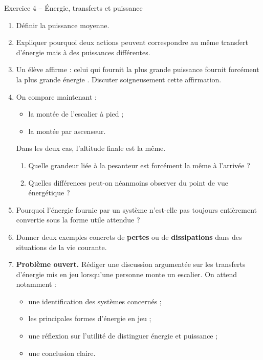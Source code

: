 \documentclass[11pt,a4paper]{article}
\begin{document}
\begin{exobox}{Exercice 4 -- Énergie, transferts et puissance}
\begin{enumerate}[label=\textbf{\arabic*.}]
    \item Définir la puissance moyenne.

    \item Expliquer pourquoi deux actions peuvent correspondre au même transfert d’énergie mais à des puissances différentes.

    \item Un élève affirme : \og celui qui fournit la plus grande puissance fournit forcément la plus grande énergie \fg.  
    Discuter soigneusement cette affirmation.

    \item On compare maintenant :
    \begin{itemize}
        \item la montée de l’escalier à pied ;
        \item la montée par ascenseur.
    \end{itemize}
    Dans les deux cas, l’altitude finale est la même.
    \begin{enumerate}[label=\alph*)]
        \item Quelle grandeur liée à la pesanteur est forcément la même à l’arrivée ?
        \item Quelles différences peut-on néanmoins observer du point de vue énergétique ?
    \end{enumerate}

    \item Pourquoi l’énergie fournie par un système n’est-elle pas toujours entièrement convertie sous la forme utile attendue ?

    \item Donner deux exemples concrets de \textbf{pertes} ou de \textbf{dissipations} dans des situations de la vie courante.

    \item \textbf{Problème ouvert.}  
    Rédiger une discussion argumentée sur les transferts d’énergie mis en jeu lorsqu’une personne monte un escalier.  
    On attend notamment :
    \begin{itemize}
        \item une identification des systèmes concernés ;
        \item les principales formes d’énergie en jeu ;
        \item une réflexion sur l’utilité de distinguer énergie et puissance ;
        \item une conclusion claire.
    \end{itemize}
\end{enumerate}
\end{exobox}
\end{document}
